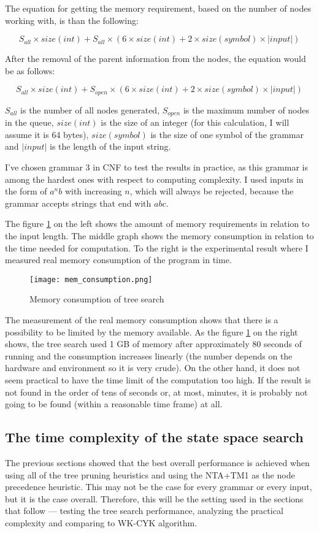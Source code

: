 The equation for getting the memory requirement, based on the number of nodes working with, is than the following:

$$S_{all} \times size(int) + S_{all} \times (6 \times size(int) + 2 \times size(symbol) \times |input|)$$

After the removal of the parent information from the nodes, the equation would be as follows:

$$S_{all} \times size(int) + S_{open} \times (6 \times size(int) + 2 \times size(symbol) \times |input|)$$

$S_{all}$ is the number of all nodes generated, $S_{open}$ is the maximum number of nodes in the queue, $size(int)$ is the size of an integer (for this calculation, I will assume it is 64 bytes), $size(symbol)$ is the size of one symbol of the grammar and $|input|$ is the length of the input string.

I've chosen grammar 3 in CNF to test the results in practice, as this grammar is among the hardest ones with respect to computing complexity. I used inputs in the form of $a^nb$ with increasing $n$, which will always be rejected, because the grammar accepts strings that end with $abc$.

The figure \ref{fig:mem_consumption} on the left shows the amount of memory requirements in relation to the input length. The middle graph shows the memory consumption in relation to the time needed for computation. To the right is the experimental result where I measured real memory consumption of the program in time.

\begin{figure}[h!]
  \texttt{[image: mem\_consumption.png]}
  \caption{Memory consumption of tree search}
  \label{fig:mem_consumption}
\end{figure}

The measurement of the real memory consumption shows that there is a possibility to be limited by the memory available. As the figure \ref{fig:mem_consumption} on the right shows, the tree search used 1 GB of memory after approximately 80 seconds of running and the consumption increases linearly (the number depends on the hardware and environment so it is very crude). On the other hand, it does not seem practical to have the time limit of the computation too high. If the result is not found in the order of tens of seconds or, at most, minutes, it is probably not going to be found (within a reasonable time frame) at all.

\subsection{The time complexity of the state space search}
The previous sections showed that the best overall performance is achieved when using all of the tree pruning heuristics and using the NTA+TM1 as the node precedence heuristic. This may not be the case for every grammar or every input, but it is the case overall. Therefore, this will be the setting used in the sections that follow --- testing the tree search performance, analyzing the practical complexity and comparing to WK-CYK algorithm.

